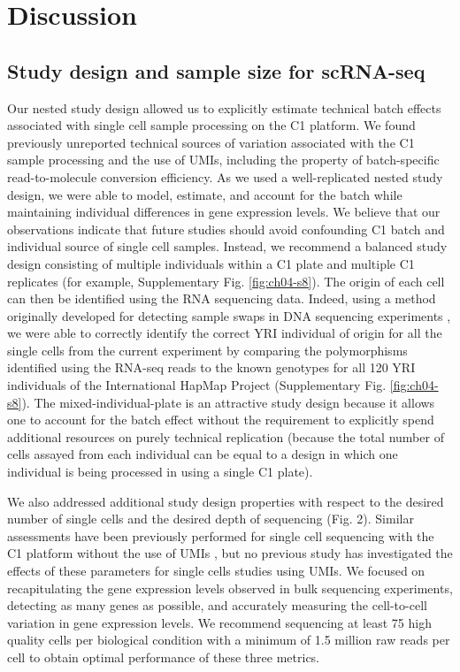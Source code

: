 \section{Discussion}\label{ch04-discussion}

\subsection{Study design and sample size for
scRNA-seq}\label{study-design-and-sample-size-for-scrna-seq}

Our nested study design allowed us to explicitly estimate technical
batch effects associated with single cell sample processing on the C1
platform. We found previously unreported technical sources of
variation associated with the C1 sample processing and the use of
UMIs, including the property of batch-specific read-to-molecule
conversion efficiency.  As we used a well-replicated nested study
design, we were able to model, estimate, and account for the batch
while maintaining individual differences in gene expression levels. We
believe that our observations indicate that future studies should
avoid confounding C1 batch and individual source of single cell
samples. Instead, we recommend a balanced study design consisting of
multiple individuals within a C1 plate and multiple C1 replicates (for
example, Supplementary Fig. \ref{fig:ch04-s8}).  The origin of each
cell can then be identified using the RNA sequencing data. Indeed,
using a method originally developed for detecting sample swaps in DNA
sequencing experiments \citep{Jun2012}, we were able to correctly
identify the correct YRI individual of origin for all the single cells
from the current experiment by comparing the polymorphisms identified
using the RNA-seq reads to the known genotypes for all 120 YRI
individuals of the International HapMap Project
\citep{HapMapConsortium2005} (Supplementary
Fig. \ref{fig:ch04-s8}). The mixed-individual-plate is an attractive
study design because it allows one to account for the batch effect
without the requirement to explicitly spend additional resources on
purely technical replication (because the total number of cells
assayed from each individual can be equal to a design in which one
individual is being processed in using a single C1 plate).

We also addressed additional study design properties with respect to
the desired number of single cells and the desired depth of sequencing
(Fig.  2). Similar assessments have been previously performed for
single cell sequencing with the C1 platform without the use of UMIs
\citep{Wu2014, Pollen2014}, but no previous study has investigated the
effects of these parameters for single cells studies using UMIs. We
focused on recapitulating the gene expression levels observed in bulk
sequencing experiments, detecting as many genes as possible, and
accurately measuring the cell-to-cell variation in gene expression
levels. We recommend sequencing at least 75 high quality cells per
biological condition with a minimum of 1.5 million raw reads per cell
to obtain optimal performance of these three metrics.

